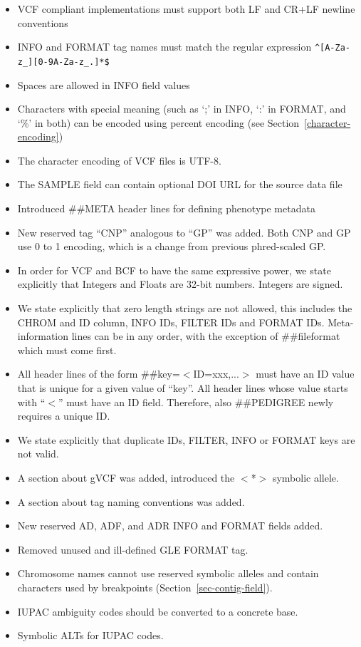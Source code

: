 \documentclass[8pt]{article}
\begin{document}
\begin{itemize}
\item VCF compliant implementations must support both LF and CR+LF newline conventions
\item INFO and FORMAT tag names must match the regular expression \texttt{\^{}[A-Za-z\_][0-9A-Za-z\_.]*\$}
\item Spaces are allowed in INFO field values
\item Characters with special meaning (such as `;' in INFO, `:' in FORMAT, and `\%' in both) can be encoded using percent encoding (see Section~\ref{character-encoding})
\item The character encoding of VCF files is UTF-8.
\item The SAMPLE field can contain optional DOI URL for the source data file
\item Introduced \#\#META header lines for defining phenotype metadata
\item New reserved tag ``CNP'' analogous to ``GP'' was added. Both CNP and GP use 0 to 1 encoding, which is a change from previous phred-scaled GP.
\item In order for VCF and BCF to have the same expressive power, we state explicitly that Integers and Floats are 32-bit numbers.
Integers are signed.
\item We state explicitly that zero length strings are not allowed, this includes the CHROM and ID column, INFO IDs, FILTER IDs and FORMAT IDs.
Meta-information lines can be in any order, with the exception of \#\#fileformat which must come first.
\item All header  lines of the form \#\#key=$<$ID=xxx,...$>$ must have an ID value that is unique for a given value of ``key''.
All header lines whose value starts with ``$<$'' must have an ID field.
Therefore, also \#\#PEDIGREE newly requires a unique ID.
\item We state explicitly that duplicate IDs, FILTER, INFO or FORMAT keys are not valid.
\item A section about gVCF was added, introduced the $<$*$>$ symbolic allele.
\item A section about tag naming conventions was added.
\item New reserved AD, ADF, and ADR INFO and FORMAT fields added.
\item Removed unused and ill-defined GLE FORMAT tag.
\item Chromosome names cannot use reserved symbolic alleles and contain characters used by breakpoints (Section~\ref{sec-contig-field}).
\item IUPAC ambiguity codes should be converted to a concrete base.
\item Symbolic ALTs for IUPAC codes.
\end{itemize}
\end{document}
